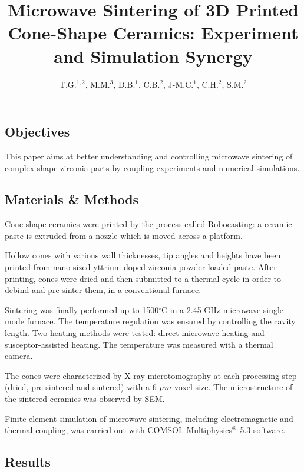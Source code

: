 \documentclass[11pt,a4paper,twocolumn]{article}
\author{T.G.$^{1,2}$, M.M.$^3$, D.B.$^1$, C.B.$^2$, J-M.C.$^1$, C.H.$^2$, S.M.$^2$}
\title{\textbf{Microwave Sintering of 3D Printed Cone-Shape Ceramics: Experiment and Simulation Synergy}}
\date{\textit{\begin{scriptsize}
$^1$Univ. Grenoble Alpes, CNRS, Grenoble INP, SIMAP, 38000 GRENOBLE\\
$^2$Normandie Univ, CNRS, ENSICAEN, Lab CRISMAT, UMR 6508, 6 Blvd Marechal Juin, F-14050 Caen\\
$^3$Univ. Lyon, INSA-LYON, MATEIS, UMR CNRS 5510, F69621 Villeurbanne, France
\end{scriptsize}}}
\begin{document}
\maketitle
\thispagestyle{empty}

\begin{center}
\section*{Objectives}	
\end{center}

This paper aims at better understanding and controlling microwave sintering of complex-shape zirconia parts by coupling experiments and numerical simulations.

\begin{center}
\item \section*{Materials \& Methods}
\end{center}

Cone-shape ceramics were printed by the process called Robocasting: a ceramic paste is extruded from a nozzle which is moved across a platform.

Hollow cones with various wall thicknesses, tip angles and heights have been printed from nano-sized yttrium-doped zirconia powder loaded paste. After printing, cones were dried and then submitted to a thermal cycle in order to debind and pre-sinter them, in a conventional furnace.

Sintering was finally performed up to 1500$^\circ$C in a 2.45 GHz microwave single-mode furnace. The temperature regulation was ensured by controlling the cavity length. Two heating methods were tested: direct microwave heating and susceptor-assisted heating. The temperature was measured with a thermal camera.

The cones were characterized by X-ray microtomography at each processing step (dried, pre-sintered and sintered) with a 6 $\mu m$ voxel size. The microstructure of the sintered ceramics was observed by SEM.

Finite element simulation of microwave sintering, including electromagnetic and thermal coupling, was carried out with COMSOL Multiphysics$^{\mbox{\scriptsize{\textregistered}}}$ 5.3 software.

\begin{center}
\item \section*{Results}
\end{center}
\end{document}
